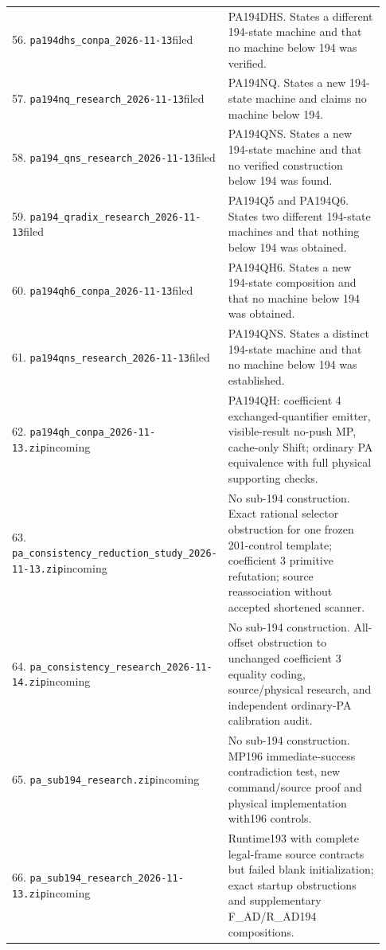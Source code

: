 {\begin{longtable}{@{}p{0.34\linewidth}p{0.59\linewidth}@{}}
56. \nolinkurl{pa194dhs_conpa_2026-11-13}\newline filed&PA194DHS. States a different 194-state machine and that no machine below 194 was verified.\\[4pt]
57. \nolinkurl{pa194nq_research_2026-11-13}\newline filed&PA194NQ. States a new 194-state machine and claims no machine below 194.\\[4pt]
58. \nolinkurl{pa194_qns_research_2026-11-13}\newline filed&PA194QNS. States a new 194-state machine and that no verified construction below 194 was found.\\[4pt]
59. \nolinkurl{pa194_qradix_research_2026-11-13}\newline filed&PA194Q5 and PA194Q6. States two different 194-state machines and that nothing below 194 was obtained.\\[4pt]
60. \nolinkurl{pa194qh6_conpa_2026-11-13}\newline filed&PA194QH6. States a new 194-state composition and that no machine below 194 was obtained.\\[4pt]
61. \nolinkurl{pa194qns_research_2026-11-13}\newline filed&PA194QNS. States a distinct 194-state machine and that no machine below 194 was established.\\[4pt]
62. \nolinkurl{pa194qh_conpa_2026-11-13.zip}\newline incoming&PA194QH: coefficient 4 exchanged-quantifier emitter, visible-result no-push MP, cache-only Shift; ordinary PA equivalence with full physical supporting checks.\\[4pt]
63. \nolinkurl{pa_consistency_reduction_study_2026-11-13.zip}\newline incoming&No sub-194 construction. Exact rational selector obstruction for one frozen 201-control template; coefficient 3 primitive refutation; source reassociation without accepted shortened scanner.\\[4pt]
64. \nolinkurl{pa_consistency_research_2026-11-14.zip}\newline incoming&No sub-194 construction. All-offset obstruction to unchanged coefficient 3 equality coding, source/physical research, and independent ordinary-PA calibration audit.\\[4pt]
65. \nolinkurl{pa_sub194_research.zip}\newline incoming&No sub-194 construction. MP196 immediate-success contradiction test, new command/source proof and physical implementation with196 controls.\\[4pt]
66. \nolinkurl{pa_sub194_research_2026-11-13.zip}\newline incoming&Runtime193 with complete legal-frame source contracts but failed blank initialization; exact startup obstructions and supplementary F\_AD/R\_AD194 compositions.\\[4pt]
\bottomrule
\end{longtable}
}
